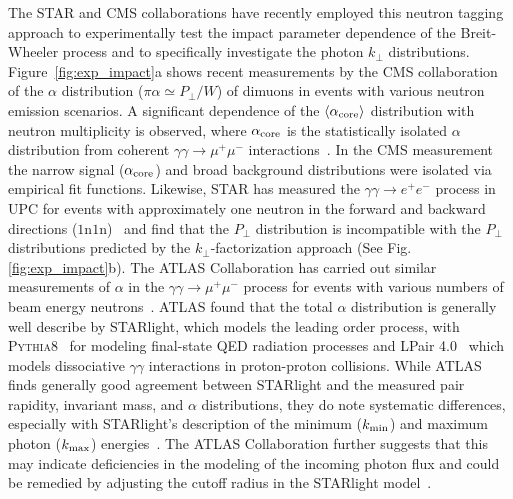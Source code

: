 \documentclass[twocolumn,epjc3]{svjour3}\sloppy
\begin{document}
The STAR and CMS collaborations have recently employed this neutron tagging approach to experimentally test the impact parameter dependence of the Breit-Wheeler process and to specifically investigate the photon $k_\perp$ distributions.
Figure~\ref{fig:exp_impact}a shows recent measurements by the CMS collaboration of the $\alpha$ distribution ($\pi\alpha \simeq P_\perp / W$) of dimuons in events with various neutron emission scenarios.
A significant dependence of the $\langle\alpha_{\rm core}\rangle$ distribution with neutron multiplicity is observed, where $\alpha_{\rm core}$ is the statistically isolated $\alpha$ distribution from coherent $\gamma\gamma \rightarrow \mu^+\mu^-$ interactions~\cite{cmscollaborationObservationForwardNeutron2020a}. 
In the CMS measurement the narrow signal ($\alpha_{\rm core}$) and broad background distributions were isolated via empirical fit functions. Likewise, STAR has measured the $\gamma\gamma \rightarrow e^+e^-$ process in UPC for events with approximately one neutron in the forward and backward directions ($1$n$1$n)~\cite{starcollaborationMeasurementMomentumAngular2021} and find that the $P_\perp$ distribution is incompatible with the $P_\perp$ distributions predicted by the $k_\perp$-factorization approach (See Fig.\ref{fig:exp_impact}b).
The ATLAS Collaboration has carried out similar measurements of $\alpha$ in the $\gamma\gamma \rightarrow \mu^+\mu^-$ process for events with various numbers of beam energy neutrons~\cite{atlascollaborationExclusiveDimuonProduction2020}. ATLAS found that the total $\alpha$ distribution is generally well describe by STARlight, which models the leading order process, with P\textsc{ythia}8~\cite{sjostrandIntroductionPYTHIA2015} for modeling final-state QED radiation processes and LPair 4.0~\cite{vermaserenTwophotonProcessesVery1983} which models dissociative $\gamma\gamma$ interactions in proton-proton collisions. While ATLAS finds generally good agreement between STARlight and the measured pair rapidity, invariant mass, and $\alpha$ distributions, they do note systematic differences, especially with STARlight's description of the minimum ($k_{\rm min}$) and maximum photon ($k_{\rm max}$) energies~\cite{atlascollaborationExclusiveDimuonProduction2020}. The ATLAS Collaboration further suggests that this may indicate deficiencies in the modeling of the incoming photon flux and could be remedied by adjusting the cutoff radius in the STARlight model~\cite{atlascollaborationExclusiveDimuonProduction2020}.        
\end{document}
